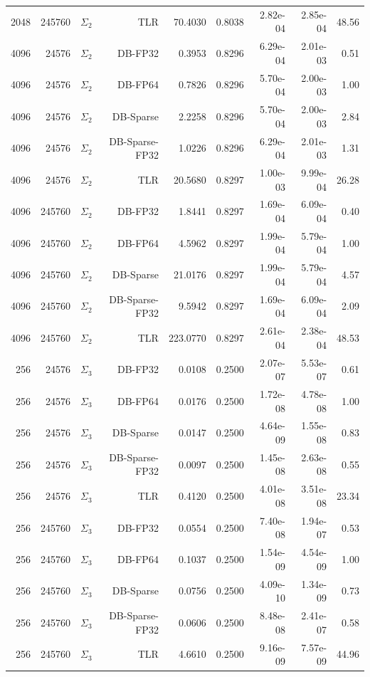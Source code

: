 \begin{tabular}{|r|r|r|r|r|r|r|r|r|}
  2048 & 245760 & $\Sigma_2$ & TLR & 70.4030 & 0.8038 & 2.82e-04 & 2.85e-04 & 48.56 \\
  4096 & 24576 & $\Sigma_2$ & DB-FP32 & 0.3953 & 0.8296 & 6.29e-04 & 2.01e-03 & 0.51 \\
  4096 & 24576 & $\Sigma_2$ & DB-FP64 & 0.7826 & 0.8296 & 5.70e-04 & 2.00e-03 & 1.00 \\
  4096 & 24576 & $\Sigma_2$ & DB-Sparse & 2.2258 & 0.8296 & 5.70e-04 & 2.00e-03 & 2.84 \\
  4096 & 24576 & $\Sigma_2$ & DB-Sparse-FP32 & 1.0226 & 0.8296 & 6.29e-04 & 2.01e-03 & 1.31 \\
  4096 & 24576 & $\Sigma_2$ & TLR & 20.5680 & 0.8297 & 1.00e-03 & 9.99e-04 & 26.28 \\
  4096 & 245760 & $\Sigma_2$ & DB-FP32 & 1.8441 & 0.8297 & 1.69e-04 & 6.09e-04 & 0.40 \\
  4096 & 245760 & $\Sigma_2$ & DB-FP64 & 4.5962 & 0.8297 & 1.99e-04 & 5.79e-04 & 1.00 \\
  4096 & 245760 & $\Sigma_2$ & DB-Sparse & 21.0176 & 0.8297 & 1.99e-04 & 5.79e-04 & 4.57 \\
  4096 & 245760 & $\Sigma_2$ & DB-Sparse-FP32 & 9.5942 & 0.8297 & 1.69e-04 & 6.09e-04 & 2.09 \\
  4096 & 245760 & $\Sigma_2$ & TLR & 223.0770 & 0.8297 & 2.61e-04 & 2.38e-04 & 48.53 \\
  256 & 24576 & $\Sigma_3$ & DB-FP32 & 0.0108 & 0.2500 & 2.07e-07 & 5.53e-07 & 0.61 \\
  256 & 24576 & $\Sigma_3$ & DB-FP64 & 0.0176 & 0.2500 & 1.72e-08 & 4.78e-08 & 1.00 \\
  256 & 24576 & $\Sigma_3$ & DB-Sparse & 0.0147 & 0.2500 & 4.64e-09 & 1.55e-08 & 0.83 \\
  256 & 24576 & $\Sigma_3$ & DB-Sparse-FP32 & 0.0097 & 0.2500 & 1.45e-08 & 2.63e-08 & 0.55 \\
  256 & 24576 & $\Sigma_3$ & TLR & 0.4120 & 0.2500 & 4.01e-08 & 3.51e-08 & 23.34 \\
  256 & 245760 & $\Sigma_3$ & DB-FP32 & 0.0554 & 0.2500 & 7.40e-08 & 1.94e-07 & 0.53 \\
  256 & 245760 & $\Sigma_3$ & DB-FP64 & 0.1037 & 0.2500 & 1.54e-09 & 4.54e-09 & 1.00 \\
  256 & 245760 & $\Sigma_3$ & DB-Sparse & 0.0756 & 0.2500 & 4.09e-10 & 1.34e-09 & 0.73 \\
  256 & 245760 & $\Sigma_3$ & DB-Sparse-FP32 & 0.0606 & 0.2500 & 8.48e-08 & 2.41e-07 & 0.58 \\
  256 & 245760 & $\Sigma_3$ & TLR & 4.6610 & 0.2500 & 9.16e-09 & 7.57e-09 & 44.96 \\

\end{tabular}
